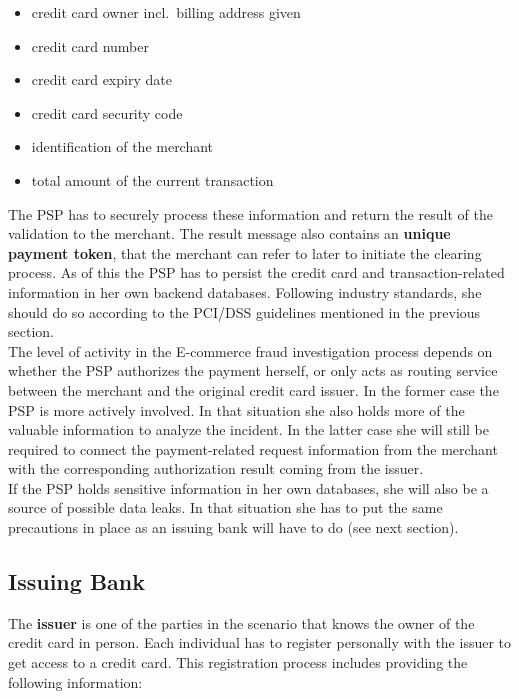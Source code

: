 \begin{itemize}
		\item credit card owner incl.\ billing address given
		\item credit card number
		\item credit card expiry date
		\item credit card security code
		\item identification of the merchant
		\item total amount of the current transaction
\end{itemize}

The \gls{PSP} has to securely process these information and return the result of the validation to the merchant. The result message also contains an \textbf{unique payment token}, that the merchant can refer to later to initiate the clearing process. As of this the \gls{PSP} has to persist the credit card and transaction-related information in her own backend databases. Following industry standards, she should do so according to the PCI/DSS guidelines mentioned in the previous section. \\

The level of activity in the E-commerce fraud investigation process depends on whether the \gls{PSP} authorizes the payment herself, or only acts as routing service between the merchant and the original credit card issuer. In the former case the \gls{PSP} is more actively involved. In that situation she also holds more of the valuable information to analyze the incident. In the latter case she will still be required to connect the payment-related request information from the merchant with the corresponding authorization result coming from the issuer.\\

If the \gls{PSP} holds sensitive information in her own databases, she will also be a source of possible data leaks. In that situation she has to put the same precautions in place as an issuing bank will have to do (see next section).


\subsection{Issuing Bank}
\label{subsec:stakeholder_issuer}

The \textbf{issuer} is one of the parties in the scenario that knows the owner of the credit card in person. Each individual has to register personally with the issuer to get access to a credit card. This registration process includes providing the following information: \@

